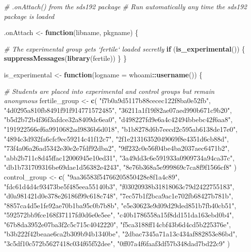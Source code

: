 \documentclass[12pt,twoside]{reedthesis}
\newenvironment{Shaded}{\begin{snugshade}}{\end{snugshade}}
\newcommand{\CommentTok}[1]{\textcolor[rgb]{0.56,0.35,0.01}{\textit{#1}}}
\newcommand{\ControlFlowTok}[1]{\textcolor[rgb]{0.13,0.29,0.53}{\textbf{#1}}}
\newcommand{\DataTypeTok}[1]{\textcolor[rgb]{0.13,0.29,0.53}{#1}}
\newcommand{\KeywordTok}[1]{\textcolor[rgb]{0.13,0.29,0.53}{\textbf{#1}}}
\newcommand{\NormalTok}[1]{#1}
\newcommand{\OperatorTok}[1]{\textcolor[rgb]{0.81,0.36,0.00}{\textbf{#1}}}
\newcommand{\StringTok}[1]{\textcolor[rgb]{0.31,0.60,0.02}{#1}}
\begin{document}
\begin{Shaded}
\begin{Highlighting}[]
\CommentTok{# .onAttach() from the sds192 package}
\CommentTok{# Run automatically any time the sds192 package is loaded}

\NormalTok{.onAttach <-}\StringTok{ }\ControlFlowTok{function}\NormalTok{(libname, pkgname) \{}

  \CommentTok{# The experimental group gets `fertile` loaded secretly}
  \ControlFlowTok{if}\NormalTok{ (}\KeywordTok{is_experimental}\NormalTok{()) \{}
    \KeywordTok{suppressMessages}\NormalTok{(}\KeywordTok{library}\NormalTok{(fertile))}
\NormalTok{  \}}
\NormalTok{\}}

\NormalTok{is_experimental <-}\StringTok{ }\ControlFlowTok{function}\NormalTok{(}\DataTypeTok{logname =}\NormalTok{ whoami}\OperatorTok{::}\KeywordTok{username}\NormalTok{()) \{}
  
  \CommentTok{# Students are placed into experimental and control groups but remain anonymous}
\NormalTok{  fertile_group <-}\StringTok{ }\KeywordTok{c}\NormalTok{(}
    \StringTok{"f7b0a9d5117b88cecec122f8ba0e52fb"}\NormalTok{, }\StringTok{"4d0295a810fb8491f91f914771572485"}\NormalTok{, }
    \StringTok{"36211a1f19f82ae07aed990b671c9b20"}\NormalTok{, }\StringTok{"b5d2b72b4f36f3afdce32a8409dc6ea0"}\NormalTok{,}
    \StringTok{"d498227fd9e6a4c42494bbebc42f6aa8"}\NormalTok{, }\StringTok{"191922566ef6a9910682ad9836b6d018"}\NormalTok{, }
    \StringTok{"b1b8278d6b7eecd2c595ab6138de17e0"}\NormalTok{, }\StringTok{"4894c3d932fa6cfc9ec59214c41f12c7"}\NormalTok{,}
    \StringTok{"2f1e21316352049069f8e4351d6cb88d"}\NormalTok{, }\StringTok{"73f4a06a26ad5342e30e2e7fdf92dba2"}\NormalTok{, }
    \StringTok{"9ff232c0e56f04be4ba2037aec6471b2"}\NormalTok{, }\StringTok{"abb2b711c8d45ffac12006945e10ed31"}\NormalTok{,}
    \StringTok{"3a49dd3c6e591933a0909734a94ca37c"}\NormalTok{, }\StringTok{"db1b731709316be69dae1d56382e4243"}\NormalTok{, }
    \StringTok{"8e76b368a5e999869c7ca8f9f1566cf8"}
\NormalTok{  )}
\NormalTok{  control_group <-}\StringTok{ }\KeywordTok{c}\NormalTok{(}
    \StringTok{"9aa36583f54766205850428e8f1a4c89"}\NormalTok{, }\StringTok{"fdc61d4d4c93473be5f485eea55140b3"}\NormalTok{, }
    \StringTok{"f03020938b31818063c79d2422755183"}\NormalTok{, }\StringTok{"d0a981421d0e378e26186f99c618c748"}\NormalTok{,}
    \StringTok{"7ec57b1f2bca9ac1e702fb68427b781b"}\NormalTok{, }\StringTok{"8857ca4d5e1fe92ae70b1ba95c0b7b8b"}\NormalTok{, }
    \StringTok{"e5e30623e9d09d29ded851b7fb40cb51"}\NormalTok{, }\StringTok{"592572bb9fce168f37117fd0d6e0e5ee"}\NormalTok{,}
    \StringTok{"c40b1786558a15f8dd151da163ebd0b4"}\NormalTok{, }\StringTok{"67b8da3952e07ba3f2c5c715c4042220"}\NormalTok{, }
    \StringTok{"f5ca3188ff14cbf43b6d4cd5b225376e"}\NormalTok{, }\StringTok{"b3b222f42beaae6ca2b309b94b1340be"}\NormalTok{,}
    \StringTok{"2dbac7345a71a13c434af882853e86bd"}\NormalTok{, }\StringTok{"3c5df10c572b5627418c034f65f52dee"}\NormalTok{, }
    \StringTok{"0ff07a4f6faaf3df57b348dad7bd22c9"}
\NormalTok{  )}
  

\end{Highlighting}
\end{Shaded}
\end{document}
